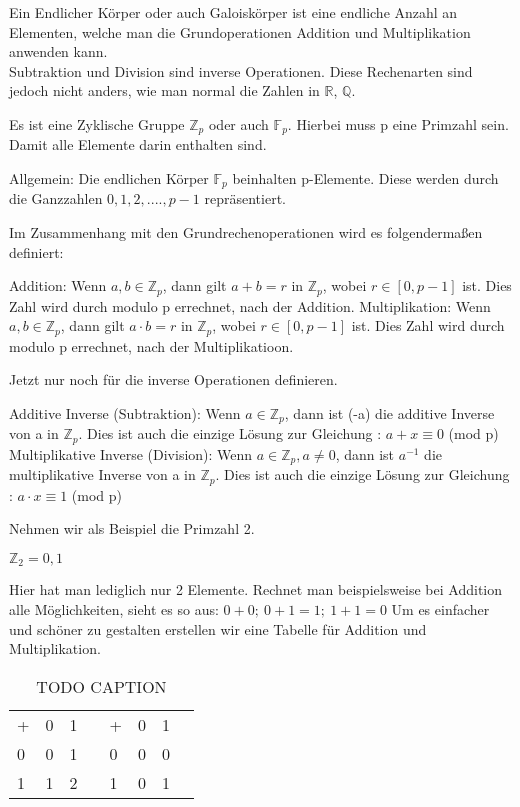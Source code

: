 Ein Endlicher Körper oder auch Galoiskörper ist eine endliche Anzahl an Elementen, welche man die Grundoperationen Addition und Multiplikation anwenden kann.\\

Subtraktion und Division sind inverse Operationen. Diese Rechenarten sind jedoch nicht anders, wie man normal die Zahlen in $\mathbb{R}$, $\mathbb{Q}$.

Es ist eine Zyklische Gruppe $ \mathbb{Z}_p $ oder auch $ \mathbb{F}_p $. Hierbei muss p eine Primzahl sein. Damit alle Elemente darin enthalten sind. 

Allgemein: Die endlichen Körper $\mathbb{F}_p$ beinhalten p-Elemente. Diese werden durch die Ganzzahlen ${0,1,2,....,p-1}$ repräsentiert. 

Im Zusammenhang mit den Grundrechenoperationen wird es folgendermaßen definiert:

Addition: Wenn $ a, b \in \mathbb{Z}_p $, dann gilt $ a+b =r$ in $ \mathbb{Z}_p $, wobei $r \in [0, p-1]$ ist. Dies Zahl wird durch modulo p errechnet, nach der Addition.
Multiplikation: Wenn $ a, b \in \mathbb{Z}_p $, dann gilt $ a \cdot b =r$ in $ \mathbb{Z}_p $, wobei $r \in [0, p-1]$ ist. Dies Zahl wird durch modulo p errechnet, nach der Multiplikatioon.

Jetzt nur noch für die inverse Operationen definieren.

Additive Inverse (Subtraktion): Wenn $a \in \mathbb{Z}_p$, dann ist (-a) die additive Inverse von a in $\mathbb{Z}_p$. Dies ist auch die einzige Lösung zur Gleichung : $a + x \equiv 0$ (mod p)
Multiplikative Inverse (Division): Wenn $a \in \mathbb{Z}_p, a \neq 0 $,  dann ist $a^{-1}$ die multiplikative Inverse von a in $\mathbb{Z}_p$. Dies ist auch die einzige Lösung zur Gleichung : $a \cdot x \equiv 1$ (mod p)

Nehmen wir als Beispiel die Primzahl 2.

$ \mathbb{Z}_2 = {0,1} $

Hier hat man lediglich nur 2 Elemente. Rechnet man beispielsweise bei Addition alle Möglichkeiten, sieht es so aus: $0 + 0;\ 0 + 1 = 1;\ 1 + 1 = 0$ 
Um es einfacher und schöner zu gestalten erstellen wir eine Tabelle für Addition und Multiplikation.


\begin{table}[h]\caption{TODO CAPTION}
    \begin{tabular}{l|l|lll|l|ll}
    + & 0 & 1 &  & + & 0 & 1 &  \\ \cline{1-3} \cline{5-7}
    0 & 0 & 1 &  & 0 & 0 & 0 &  \\ \cline{1-3} \cline{5-7}
    1 & 1 & 2 &  & 1 & 0 & 1 & 
    \end{tabular}
\end{table}

